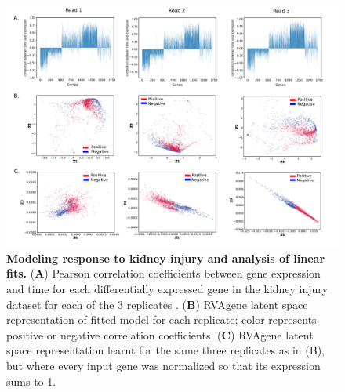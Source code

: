 \newpage

\begin{center}
\begin{figure}[H]
  \includegraphics[width = \linewidth]{figures/fig8.png}
    \caption[Modeling response to kidney injury and analysis of linear fits.]{\textbf{Modeling response to kidney injury and analysis of linear fits.}
    ({\bf A}) Pearson correlation coefficients between gene expression and time for each differentially expressed gene in the kidney injury dataset for each of the 3 replicates \citep{liu2017molecular}. ({\bf B}) RVAgene latent space representation of fitted model for each replicate; color represents positive or negative correlation coefficients. ({\bf C}) RVAgene latent space representation learnt for the same three replicates as in (B), but where every input gene was normalized  so that its expression sums to 1.}
  \label{fig:figS5}
\end{figure}
\end{center}
\newpage

